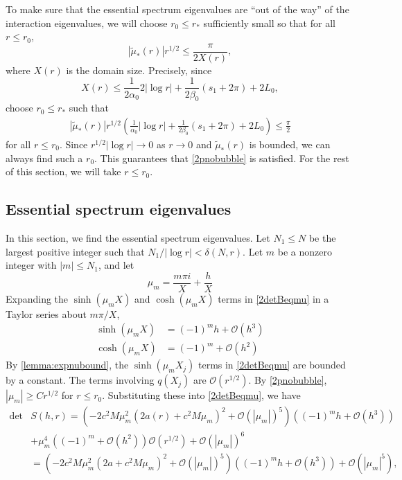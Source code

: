 \documentclass[thesis.tex]{subfiles}
\begin{document}
To make sure that the essential spectrum eigenvalues are ``out of the way'' of the interaction eigenvalues, we will choose $r_0 \leq r_*$ sufficiently small so that for all $r \leq r_0$,
\begin{equation}\label{2pnobubble}
\left|\tilde{\mu}_*(r) \right| r^{1/2}  \leq \frac{\pi}{2 X(r)},
\end{equation}
where $X(r)$ is the domain size. Precisely, since
\[
X(r) \leq \frac{1}{2 \alpha_0} 2 |\log r| + \frac{1}{2\beta_0}\left( s_1 + 2 \pi \right) + 2 L_0, 
\]
choose $r_0 \leq r_*$ such that
\begin{align}\label{2pnobubblecond}
\left|\tilde{\mu}_*(r) \right| r^{1/2} \left( \frac{1}{\alpha_0} |\log r| + \frac{1}{2\beta_0}\left( s_1 + 2 \pi \right) + 2 L_0 \right) \leq \frac{\pi}{2}
\end{align}
for all $r \leq r_0$. Since $r^{1/2}|\log r| \rightarrow 0$ as $r \rightarrow 0$ and $\tilde{\mu}_*(r)$ is bounded, we can always find such a $r_0$. This guarantees that \cref{2pnobubble} is satisfied. For the rest of this section, we will take $r \leq r_0$.

\subsection{Essential spectrum eigenvalues}

In this section, we find the essential spectrum eigenvalues. Let $N_1 \leq N$ be the largest positive integer such that $N_1/|\log r| < \delta(N,r)$. Let $m$ be a nonzero integer with $|m| \leq N_1$, and let
\begin{equation}\label{defmum}
\mu_m = \frac{m \pi i}{X} + \frac{h}{X}
\end{equation}
Expanding the $\sinh(\mu_m X)$ and $\cosh(\mu_m X)$ terms in \cref{2detBeqmu} in a Taylor series about $m \pi/X$,
\begin{align*}
\sinh(\mu_m X) &= (-1)^m h + \mathcal{O}(h^3) \\
\cosh(\mu_m X) &= (-1)^m + \mathcal{O}(h^2)
\end{align*}
By \cref{lemma:expnubound}, the $\sinh(\mu_m X_j)$ terms in \cref{2detBeqmu} are bounded by a constant. The terms involving $q(X_j)$ are $\mathcal{O}(r^{1/2})$. By \cref{2pnobubble}, $|\mu_m| \geq C r^{1/2}$ for $r \leq r_0$. Substituting these into \cref{2detBeqmu}, we have 
\begin{equation}\label{Bess1}
\begin{aligned}
\det &S(h, r) = \left(-2 c^2 M  \mu_m^2 \left( 2a(r) + c^2 M \mu_m \right)^2 + \mathcal{O}( |\mu_m|)^5 \right) \left( (-1)^m h + \mathcal{O}(h^3) \right) \\
&+ \mu_m^4 \left( (-1)^m + \mathcal{O}(h^2)\right)\mathcal{O}(r^{1/2}) + \mathcal{O}\left( |\mu_m| \right)^6 \\
&= \left(-2 c^2 M  \mu_m^2 \left( 2a + c^2 M \mu_m \right)^2 + \mathcal{O}( |\mu_m|)^5 \right) \left( (-1)^m h + \mathcal{O}(h^3) \right) + \mathcal{O}\left( |\mu_m|^5 \right),
\end{aligned}
\end{equation}
\end{document}

